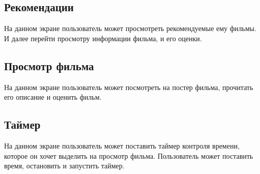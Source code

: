 
\subsection{Рекомендации}

На данном экране пользователь может просмотреть рекомендуемые ему фильмы.
И далее перейти просмотру информации фильма, и его оценки.


\subsection{Просмотр фильма}

На данном экране пользователь может посмотреть на постер фильма, прочитать его описание и оценить фильм.


\subsection{Таймер}

На данном экране пользователь может поставить таймер контроля времени, которое он хочет выделить на просмотр фильма.
Пользователь может поставить время, остановить и запустить таймер.


